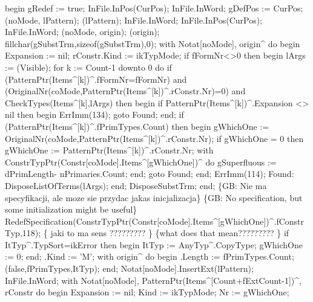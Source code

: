 begin
   gRedef := true;
   InFile.InPos(CurPos);
   InFile.InWord;
   gDefPos := CurPos;
   (noMode, lPattern);
   (lPattern);
   InFile.InWord;
   InFile.InPos(CurPos);
   InFile.InWord;
   (noMode, origin);
   (origin);
   fillchar(gSubstTrm,sizeof(gSubstTrm),0);
   with Notat[noMode], origin^ do
   begin
      Expansion := nil;
      rConstr.Kind := ikTypMode;
      if fFormNr<>0 then
      begin
         lArgs := (Visible);
         for k := Count-1 downto 0 do
            if (PatternPtr(Items^[k])^.fFormNr=fFormNr) and
                  (OriginalNr(coMode,PatternPtr(Items^[k])^.rConstr.Nr)=0) and
                  CheckTypes(Items^[k],lArgs) then
            begin
               if PatternPtr(Items^[k])^.Expansion <> nil then
               begin
                  ErrImm(134);
                  goto Found;
               end;
               if (PatternPtr(Items^[k])^.fPrimTypes.Count) then
               begin
                  gWhichOne := OriginalNr(coMode,PatternPtr(Items^[k])^.rConstr.Nr);
                  if gWhichOne = 0 then
                     gWhichOne := PatternPtr(Items^[k])^.rConstr.Nr;
                  with ConstrTypPtr(Constr[coMode].Items^[gWhichOne])^ do
                     gSuperfluous := dPrimLength- nPrimaries.Count;
               end;
               goto Found;
            end;
         ErrImm(114);
         Found:
            DisposeListOfTerms(lArgs);
      end;
      DisposeSubstTrm;
   end;
   \{GB: Nie ma specyfikacji, ale moze sie przydac jakas inicjalizacja\}
   \{GB: No specification, but some initialization might be useful\}
   RedefSpecification(ConstrTypPtr(Constr[coMode].Items^[gWhichOne])^.fConstrTyp,118);
   \{ jaki to ma sens ????????? \} \{what does that mean????????? \}
   if ItTyp^.TypSort=ikError then
   begin
      ItTyp := AnyTyp^.CopyType;
      gWhichOne := 0;
   end;
   .Kind := 'M';
   with origin^ do
   begin
      .Length := fPrimTypes.Count;
      (false,fPrimTypes,ItTyp);
   end;
   Notat[noMode].InsertExt(lPattern);
   InFile.InWord;
   with Notat[noMode], PatternPtr(Items^[Count+fExtCount-1])^, rConstr do
   begin
      Expansion := nil;
      Kind := ikTypMode;
      Nr := gWhichOne;
